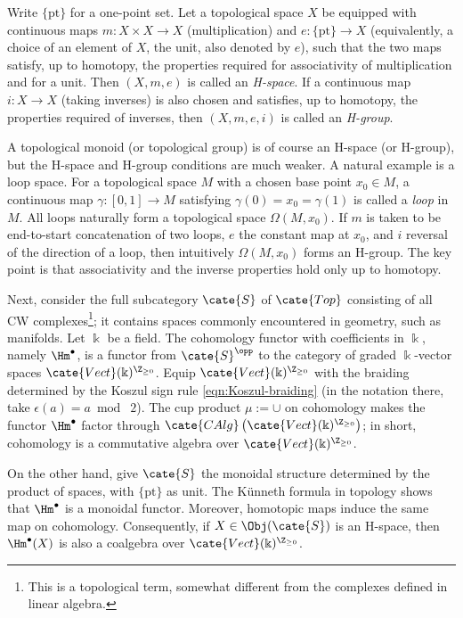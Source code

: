 \begin{example}[H.\ Hopf]
	Write $\{\mathrm{pt}\}$ for a one-point set. Let a topological space $X$
	be equipped with continuous maps $m:X\times X\to X$ (multiplication) and
	$e:\{\mathrm{pt}\}\to X$ (equivalently, a choice of an element of $X$,
	the unit, also denoted by $e$), such that the two maps satisfy, up to
	homotopy, the properties required for associativity of multiplication and
	for a unit. Then $(X,m,e)$ is called an \emph{H-space}. If a continuous map
	$i:X\to X$ (taking inverses) is also chosen and satisfies, up to homotopy,
	the properties required of inverses, then $(X,m,e,i)$ is called an
	\emph{H-group}.

	A topological monoid (or topological group) is of course an H-space (or
	H-group), but the H-space and H-group conditions are much weaker. A natural
	example is a loop space. For a topological space $M$ with a chosen base
	point $x_0\in M$, a continuous map $\gamma:[0,1]\to M$ satisfying
	$\gamma(0)=x_0=\gamma(1)$ is called a \emph{loop} in $M$. All loops
	naturally form a topological space $\Omega(M,x_0)$. If $m$ is taken to be
	end-to-start concatenation of two loops, $e$ the constant map at $x_0$,
	and $i$ reversal of the direction of a loop, then intuitively
	$\Omega(M,x_0)$ forms an H-group. The key point is that associativity and
	the inverse properties hold only up to homotopy.

	Next, consider the full subcategory $\cate{S}$ of $\cate{Top}$ consisting
	of all CW complexes\footnote{This is a topological term, somewhat different
	from the complexes defined in linear algebra.}; it contains spaces commonly
	encountered in geometry, such as manifolds. Let $\Bbbk$ be a field. The
	cohomology functor with coefficients in $\Bbbk$, namely $\Hm^\bullet$, is a
	functor from $\cate{S}^{\opp}$ to the category of graded $\Bbbk$-vector
	spaces $\cate{Vect}(\Bbbk)^{\Z_{\geq0}}$. Equip
	$\cate{Vect}(\Bbbk)^{\Z_{\geq0}}$ with the braiding determined by the
	Koszul sign rule \eqref{eqn:Koszul-braiding} (in the notation there, take
	$\epsilon(a)=a\bmod\;2$). The cup product $\mu:=\cup$ on cohomology makes
	the functor $\Hm^\bullet$ factor through
	$\cate{CAlg}\left(\cate{Vect}(\Bbbk)^{\Z_{\geq0}}\right)$; in short,
	cohomology is a commutative algebra over
	$\cate{Vect}(\Bbbk)^{\Z_{\geq0}}$.

	On the other hand, give $\cate{S}$ the monoidal structure determined by
	the product of spaces, with $\{\mathrm{pt}\}$ as unit. The Künneth formula
	in topology shows that $\Hm^\bullet$ is a monoidal functor. Moreover,
	homotopic maps induce the same map on cohomology. Consequently, if
	$X\in\Obj(\cate{S})$ is an H-space, then $\Hm^\bullet(X)$ is also a
	coalgebra over $\cate{Vect}(\Bbbk)^{\Z_{\geq0}}$.


\end{example}
